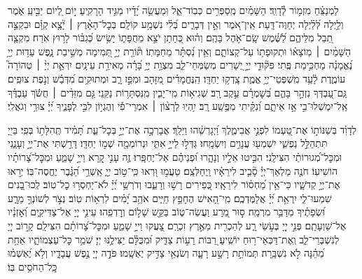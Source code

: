 \documentclass[twoside, openany, parskip=half, 11pt]{book}
\begin{document}
\begin{narrow}
לַמְנַצֵּ֗חַ מִזְמ֥וֹר לְ֯דָוִֽד׃ \hfill \break
הַשָּׁמַ֗יִם מְֽסַפְּרִ֥ים כְּבֽוֹד־אֵ֑ל וּֽמַעֲשֵׂ֥ה יָ֝דָ֗יו מַגִּ֥יד הָרָקִֽיעַ׃
י֣וֹם לְ֭יוֹם יַבִּ֣יעַֽ אֹ֑מֶר וְלַ֥יְלָה לְּ֝לַ֗יְלָה יְחַוֶּה־דָּֽעַת׃
אֵֽין־אֹ֭מֶר וְאֵ֣ין דְּבָרִ֑ים בְּ֝לִ֗י נִשְׁמָ֥ע קוֹלָֽם׃
בְּכׇל־הָאָ֨רֶץ ׀ יָ֘צָ֤א קַוָּ֗ם וּבִקְצֵ֣ה תֵ֭בֵל מִלֵּיהֶ֑ם לַ֝שֶּׁ֗מֶשׁ שָֽׂם־אֹ֥הֶל בָּהֶֽם׃
וְה֗וּא כְּ֭חָתָן יֹצֵ֣א מֵחֻפָּת֑וֹ יָשִׂ֥ישׂ כְּ֝גִבּ֗וֹר לָר֥וּץ אֹֽרַח׃
מִקְצֵ֤ה הַשָּׁמַ֨יִם ׀ מֽוֹצָא֗וֹ וּתְקוּפָת֥וֹ עַל־קְצוֹתָ֑ם וְאֵ֥ין נִ֝סְתָּ֗ר מֵחַמָּתֽוֹ׃
תּ֘וֹרַ֤ת יְיָ֣ תְּ֭מִימָה מְשִׁ֣יבַת נָ֑פֶשׁ עֵד֥וּת יְיָ֥ נֶ֝אֱמָנָ֗ה מַחְכִּ֥ימַת פֶּֽתִי׃
פִּקּ֘וּדֵ֤י יְיָ֣ יְ֭שָׁרִים מְשַׂמְּחֵי־לֵ֑ב מִצְוַ֥ת יְיָ֥ בָּ֝רָ֗ה מְאִירַ֥ת עֵינָֽיִם׃
יִרְאַ֤ת יְיָ֨ ׀ טְהוֹרָה֮ עוֹמֶ֢דֶת לָ֫עַ֥ד מִֽשְׁפְּטֵי־יְיָ֥ אֱמֶ֑ת צָֽדְק֥וּ יַחְדָּֽו׃
הַֽנֶּחֱמָדִ֗ים מִ֭זָּהָב וּמִפַּ֣ז רָ֑ב וּמְתוּקִ֥ים מִ֝דְּבַ֗שׁ וְנֹ֣פֶת צוּפִֽים׃
גַּֽם־עַ֭בְדְּךָ נִזְהָ֣ר בָּהֶ֑ם בְּ֝שׇׁמְרָ֗ם עֵ֣קֶב רָֽב׃
שְׁגִיא֥וֹת מִֽי־יָבִ֑ין מִֽנִּסְתָּר֥וֹת נַקֵּֽנִי׃
גַּ֤ם מִזֵּדִ֨ים ׀ חֲשֹׂ֬ךְ עַבְדֶּ֗ךָ אַֽל־יִמְשְׁלוּ־בִ֣י אָ֣ז אֵיתָ֑ם וְ֝נִקֵּ֗יתִי מִפֶּ֥שַֽׁע רָֽב׃
יִ֥הְיֽוּ לְרָצ֨וֹן ׀ אִמְרֵי־פִ֡י וְהֶגְי֣וֹן לִבִּ֣י לְפָנֶ֑יךָ יְ֝יָ֗ צוּרִ֥י וְגֹאֲלִֽי׃


\enlargethispage{\baselineskip}

לְדָוִ֗ד \hfill
בְּשַׁנּוֹת֣וֹ אֶת־טַ֭עְמוֹ לִפְנֵ֣י אֲבִימֶ֑לֶךְ וַ֝יְגָרְשֵׁ֗הוּ וַיֵּלַֽךְ׃
אֲבָרְכָ֣ה אֶת־יְיָ֣ בְּכׇל־עֵ֑ת תָּ֝מִ֗יד תְּֽהִלָּת֥וֹ בְּפִֽי׃
בַּייָ֭ תִּתְהַלֵּ֣ל נַפְשִׁ֑י יִשְׁמְע֖וּ עֲנָוִ֣ים וְיִשְׂמָֽחוּ׃
גַּדְּל֣וּ לַייָ֣ אִתִּ֑י וּנְרוֹמְמָ֖ה שְׁמ֣וֹ יַחְדָּֽו׃
דָּרַ֣שְׁתִּי אֶת־יְיָ֣ וְעָנָ֑נִי וּמִכׇּל־מְ֝גוּרוֹתַ֗י הִצִּילָֽנִי׃
הִבִּ֣יטוּ אֵלָ֣יו וְנָהָ֑רוּ וּ֝פְנֵיהֶ֗ם אַל־יֶחְפָּֽרוּ׃
זֶ֤ה עָנִ֣י קָ֭רָא וַייָ֣ שָׁמֵ֑עַ וּמִכׇּל־צָ֝רוֹתָ֗יו הוֹשִׁיעֽוֹ׃
חֹנֶ֤ה מַלְאַךְ־יְיָ֓ סָ֘בִ֤יב לִירֵאָ֗יו וַֽיְחַלְּצֵֽם׃
טַעֲמ֣וּ וּ֭רְאוּ כִּֽי־ט֣וֹב יְיָ֑ אַֽשְׁרֵ֥י הַ֝גֶּ֗בֶר יֶחֱסֶה־בּֽוֹ׃
יְר֣אוּ אֶת־יְיָ֣ קְדֹשָׁ֑יו כִּי־אֵ֥ין מַ֝חְס֗וֹר לִירֵאָֽיו׃
כְּ֭פִירִים רָשׁ֣וּ וְרָעֵ֑בוּ וְדֹרְשֵׁ֥י יְ֝יָ֗ לֹא־יַחְסְר֥וּ כׇל־טֽוֹב׃
לְֽכוּ־בָ֭נִים שִׁמְעוּ־לִ֑י יִֽרְאַ֥ת יְ֝יָ֗ אֲלַמֶּדְכֶֽם׃
מִֽי־הָ֭אִישׁ הֶחָפֵ֣ץ חַיִּ֑ים אֹהֵ֥ב יָ֝מִ֗ים לִרְא֥וֹת טֽוֹב׃
נְצֹ֣ר לְשׁוֹנְךָ֣ מֵרָ֑ע וּ֝שְׂפָתֶ֗יךָ מִדַּבֵּ֥ר מִרְמָֽה׃
ס֣וּר מֵ֭רָע וַעֲשֵׂה־ט֑וֹב בַּקֵּ֖שׁ שָׁל֣וֹם וְרׇדְפֵֽהוּ׃
עֵינֵ֣י יְיָ֭ אֶל־צַדִּיקִ֑ים וְ֝אׇזְנָ֗יו אֶל־שַׁוְעָתָֽם׃
פְּנֵ֣י יְיָ֭ בְּעֹ֣שֵׂי רָ֑ע לְהַכְרִ֖ית מֵאֶ֣רֶץ זִכְרָֽם׃
צָ֭עֲקוּ וַייָ֣ שָׁמֵ֑עַ וּמִכׇּל־צָ֝רוֹתָ֗ם הִצִּילָֽם׃
קָר֣וֹב יְיָ֭ לְנִשְׁבְּרֵי־לֵ֑ב וְֽאֶת־דַּכְּאֵי־ר֥וּחַ יוֹשִֽׁיעַ׃
רַ֭בּוֹת רָע֣וֹת צַדִּ֑יק וּ֝מִכֻּלָּ֗ם יַצִּילֶ֥נּוּ יְיָ׃
שֹׁמֵ֥ר כׇּל־עַצְמוֹתָ֑יו אַחַ֥ת מֵ֝הֵ֗נָּה לֹ֣א נִשְׁבָּֽרָה׃
תְּמוֹתֵ֣ת רָשָׁ֣ע רָעָ֑ה וְשֹׂנְאֵ֖י צַדִּ֣יק יֶאְשָֽׁמוּ׃
פֹּדֶ֣ה יְיָ֭ נֶ֣פֶשׁ עֲבָדָ֑יו וְלֹ֥א יֶ֝אְשְׁמ֗וּ כׇּֽל־הַחֹסִ֥ים בּֽוֹ׃




\end{narrow}
\end{document}
